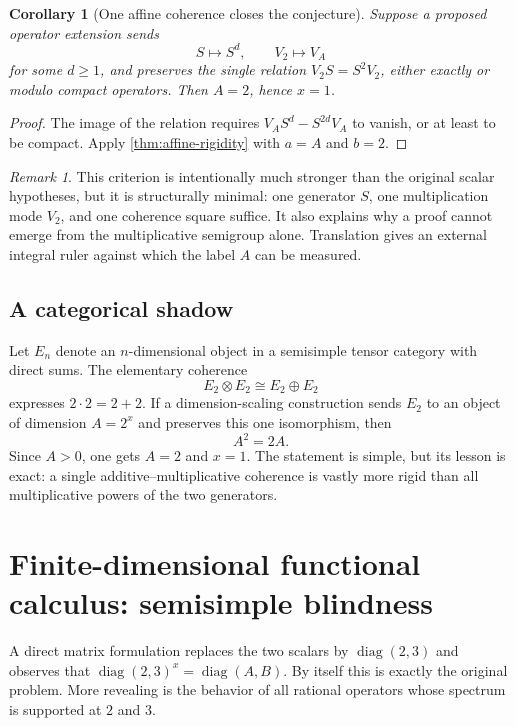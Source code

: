 \documentclass[11pt,oneside]{article}
\newtheorem{corollary}[theorem]{Corollary}
\theoremstyle{definition}
\theoremstyle{remark}
\newtheorem{remark}[theorem]{Remark}
\newcommand{\diag}{\operatorname{diag}}
\begin{document}
\begin{corollary}[One affine coherence closes the conjecture]
\label{cor:one-affine}
Suppose a proposed operator extension sends
\[
        S\longmapsto S^d,\qquad V_2\longmapsto V_A
\]
for some \(d\geq1\), and preserves the single relation
\(V_2S=S^2V_2\), either exactly or modulo compact operators.  Then
\(A=2\), hence \(x=1\).
\end{corollary}

\begin{proof}
The image of the relation requires
\(V_AS^d-S^{2d}V_A\) to vanish, or at least to be compact.
Apply \cref{thm:affine-rigidity} with \(a=A\) and \(b=2\).
\end{proof}

\begin{remark}
This criterion is intentionally much stronger than the original scalar
hypotheses, but it is structurally minimal: one generator \(S\), one
multiplication mode \(V_2\), and one coherence square suffice.  It also
explains why a proof cannot emerge from the multiplicative semigroup
alone.  Translation gives an external integral ruler against which the
label \(A\) can be measured.
\end{remark}

\subsection{A categorical shadow}

Let \(E_n\) denote an \(n\)-dimensional object in a semisimple tensor
category with direct sums.  The elementary coherence
\[
        E_2\otimes E_2\cong E_2\oplus E_2
\]
expresses \(2\cdot2=2+2\).  If a dimension-scaling construction sends
\(E_2\) to an object of dimension \(A=2^x\) and preserves this one
isomorphism, then
\[
        A^2=2A.
\]
Since \(A>0\), one gets \(A=2\) and \(x=1\).  The statement is simple,
but its lesson is exact: a single additive--multiplicative coherence is
vastly more rigid than all multiplicative powers of the two generators.


\section{Finite-dimensional functional calculus: semisimple blindness}

A direct matrix formulation replaces the two scalars by
\(\diag(2,3)\) and observes that
\(\diag(2,3)^x=\diag(A,B)\).  By itself this is exactly the original
problem.  More revealing is the behavior of all rational operators
whose spectrum is supported at \(2\) and \(3\).
\end{document}
